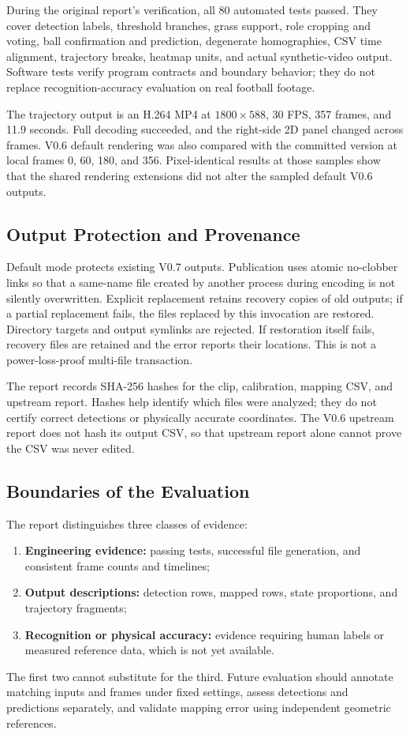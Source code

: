 \documentclass[11pt,a4paper]{article}
\begin{document}
During the original report's verification, all 80 automated tests passed.
They cover detection labels, threshold branches, grass support, role cropping
and voting, ball confirmation and prediction, degenerate homographies,
CSV time alignment, trajectory breaks, heatmap units, and actual synthetic-video
output. Software tests verify program contracts and boundary behavior;
they do not replace recognition-accuracy evaluation on real football footage.

The trajectory output is an H.264 MP4 at $1800\times588$, 30 FPS, 357 frames,
and 11.9 seconds. Full decoding succeeded, and the right-side 2D panel changed
across frames. V0.6 default rendering was also compared with the committed
version at local frames 0, 60, 180, and 356. Pixel-identical results at those
samples show that the shared rendering extensions did not alter the sampled
default V0.6 outputs.

\subsection{Output Protection and Provenance}

Default mode protects existing V0.7 outputs.
Publication uses atomic no-clobber links so that a same-name file created by
another process during encoding is not silently overwritten.
Explicit replacement retains recovery copies of old outputs; if a partial
replacement fails, the files replaced by this invocation are restored.
Directory targets and output symlinks are rejected.
If restoration itself fails, recovery files are retained and the error reports
their locations. This is not a power-loss-proof multi-file transaction.

The report records SHA-256 hashes for the clip, calibration, mapping CSV,
and upstream report. Hashes help identify which files were analyzed; they
do not certify correct detections or physically accurate coordinates.
The V0.6 upstream report does not hash its output CSV, so that upstream report
alone cannot prove the CSV was never edited.

\subsection{Boundaries of the Evaluation}

The report distinguishes three classes of evidence:
\begin{enumerate}
  \item \textbf{Engineering evidence:} passing tests, successful file generation,
        and consistent frame counts and timelines;
  \item \textbf{Output descriptions:} detection rows, mapped rows, state proportions,
        and trajectory fragments;
  \item \textbf{Recognition or physical accuracy:} evidence requiring human labels
        or measured reference data, which is not yet available.
\end{enumerate}
The first two cannot substitute for the third.
Future evaluation should annotate matching inputs and frames under fixed
settings, assess detections and predictions separately, and validate mapping
error using independent geometric references.
\end{document}
